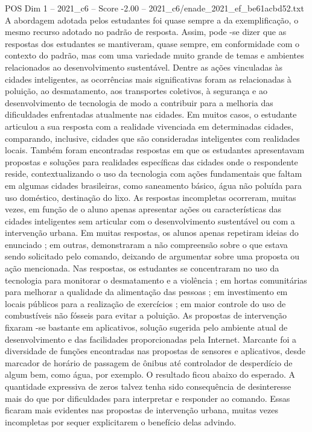 \begin{textsample}{POS Dim 1 – 2021\_c6 – Score -2.00 – 2021\_c6/enade\_2021\_ef\_be61acbd52.txt}
A abordagem adotada pelos estudantes foi quase sempre a da exemplificação, o mesmo recurso adotado no padrão de resposta.
Assim, pode -se dizer que as respostas dos estudantes se mantiveram, quase sempre, em conformidade com o contexto do padrão, mas com uma variedade muito grande de temas e ambientes relacionados ao desenvolvimento sustentável.
Dentre as ações vinculadas às cidades inteligentes, as ocorrências mais significativas foram as relacionadas à poluição, ao desmatamento, aos transportes coletivos, à segurança e ao desenvolvimento de tecnologia de modo a contribuir para a melhoria das dificuldades enfrentadas atualmente nas cidades.
Em muitos casos, o estudante articulou a sua resposta com a realidade vivenciada em determinadas cidades, comparando, inclusive, cidades que são consideradas inteligentes com realidades locais.
Também foram encontradas respostas em que os estudantes apresentavam propostas e soluções para realidades específicas das cidades onde o respondente reside, contextualizando o uso da tecnologia com ações fundamentais que faltam em algumas cidades brasileiras, como saneamento básico, água não poluída para uso doméstico, destinação do lixo.
As respostas incompletas ocorreram, muitas vezes, em função de o aluno apenas apresentar ações ou características das cidades inteligentes sem articular com o desenvolvimento sustentável ou com a intervenção urbana.
Em muitas respostas, os alunos apenas repetiram ideias do enunciado ; em outras, demonstraram a não compreensão sobre o que estava sendo solicitado pelo comando, deixando de argumentar sobre uma proposta ou ação mencionada.
Nas respostas, os estudantes se concentraram no uso da tecnologia para monitorar o desmatamento e a violência ; em hortas comunitárias para melhorar a qualidade da alimentação das pessoas ; em investimento em locais públicos para a realização de exercícios ; em maior controle do uso de combustíveis não fósseis para evitar a poluição.
As propostas de intervenção fixaram -se bastante em aplicativos, solução sugerida pelo ambiente atual de desenvolvimento e das facilidades proporcionadas pela Internet.
Marcante foi a diversidade de funções encontradas nas propostas de sensores e aplicativos, desde marcador de horário de passagem de ônibus até controlador de desperdício de algum bem, como água, por exemplo.
O resultado ficou abaixo do esperado.
A quantidade expressiva de zeros talvez tenha sido consequência de desinteresse mais do que por dificuldades para interpretar e responder ao comando.
Essas ficaram mais evidentes nas propostas de intervenção urbana, muitas vezes incompletas por sequer explicitarem o benefício delas advindo.

\end{textsample}
